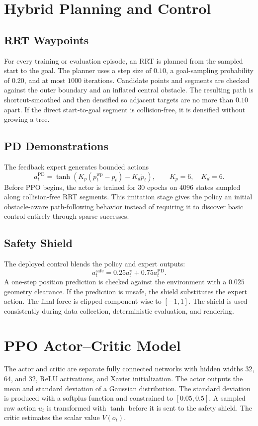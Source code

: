 \documentclass[12pt]{article}
\begin{document}
\section{Hybrid Planning and Control}

\subsection{RRT Waypoints}
For every training or evaluation episode, an RRT is planned from the sampled start to the goal. The planner uses a step size of \(0.10\), a goal-sampling probability of \(0.20\), and at most \(1000\) iterations. Candidate points and segments are checked against the outer boundary and an inflated central obstacle. The resulting path is shortcut-smoothed and then densified so adjacent targets are no more than \(0.10\) apart. If the direct start-to-goal segment is collision-free, it is densified without growing a tree.

\subsection{PD Demonstrations}
The feedback expert generates bounded actions
\[
a_t^{\mathrm{PD}}=\tanh\!\left(
K_p(p_t^{\mathrm{wp}}-p_t)-K_d\dot{p}_t
\right),
\qquad K_p=6,\quad K_d=6.
\]
Before PPO begins, the actor is trained for \(30\) epochs on \(4096\) states sampled along collision-free RRT segments. This imitation stage gives the policy an initial obstacle-aware path-following behavior instead of requiring it to discover basic control entirely through sparse successes.

\subsection{Safety Shield}
The deployed control blends the policy and expert outputs:
\[
a_t^{\mathrm{safe}}=0.25a_t^{\pi}+0.75a_t^{\mathrm{PD}}.
\]
A one-step position prediction is checked against the environment with a \(0.025\) geometry clearance. If the prediction is unsafe, the shield substitutes the expert action. The final force is clipped component-wise to \([-1,1]\). The shield is used consistently during data collection, deterministic evaluation, and rendering.

\section{PPO Actor--Critic Model}

The actor and critic are separate fully connected networks with hidden widths \(32\), \(64\), and \(32\), ReLU activations, and Xavier initialization. The actor outputs the mean and standard deviation of a Gaussian distribution. The standard deviation is produced with a softplus function and constrained to \([0.05,0.5]\). A sampled raw action \(u_t\) is transformed with \(\tanh\) before it is sent to the safety shield. The critic estimates the scalar value \(V(o_t)\).
\end{document}
